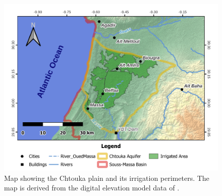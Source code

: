 \begin{figure}[h]
    \centering
    \includegraphics[width=1\textwidth]{./img/Map_ChtoukaOverview.pdf}
    \caption{Map showing the Chtouka plain and its irrigation perimeters. The map is derived from the digital elevation model data of \cite{NASA.SRTM1Arc}.}
    \label{Map-ChtoukaOverview}
\end{figure}

